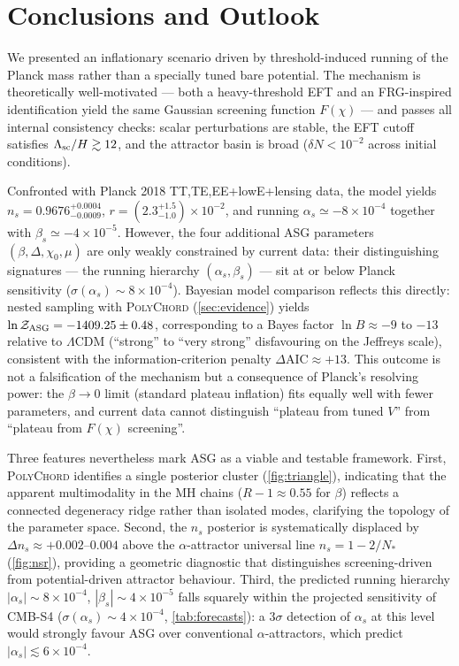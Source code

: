 \documentclass[11pt,a4paper]{article}
\begin{document}
\section{Conclusions and Outlook}
We presented an inflationary scenario driven by threshold-induced running of the Planck mass rather than a specially tuned bare potential. The mechanism is theoretically well-motivated --- both a heavy-threshold EFT and an FRG-inspired identification yield the same Gaussian screening function $F(\chi)$ --- and passes all internal consistency checks: scalar perturbations are stable, the EFT cutoff satisfies $\Lambda_{\rm sc}/H\gtrsim12$, and the attractor basin is broad ($\delta N<10^{-2}$ across initial conditions).

Confronted with Planck 2018 TT,TE,EE+lowE+lensing data, the model yields $n_{s}=0.9676^{+0.0004}_{-0.0009}$, $r=(2.3^{+1.5}_{-1.0})\times10^{-2}$, and running $\alpha_{s}\simeq-8\times10^{-4}$ together with $\beta_{s}\simeq-4\times10^{-5}$. However, the four additional ASG parameters $(\beta,\Delta,\chi_0,\mu)$ are only weakly constrained by current data: their distinguishing signatures --- the running hierarchy $(\alpha_s,\beta_s)$ --- sit at or below Planck sensitivity ($\sigma(\alpha_s)\sim8\times10^{-4}$). Bayesian model comparison reflects this directly: nested sampling with \textsc{PolyChord} (\cref{sec:evidence}) yields $\ln\mathcal{Z}_{\rm ASG}=-1409.25\pm0.48$, corresponding to a Bayes factor $\ln B\approx-9$ to $-13$ relative to $\Lambda$CDM (``strong'' to ``very strong'' disfavouring on the Jeffreys scale), consistent with the information-criterion penalty $\Delta\text{AIC}\approx+13$. This outcome is not a falsification of the mechanism but a consequence of Planck's resolving power: the $\beta\to0$ limit (standard plateau inflation) fits equally well with fewer parameters, and current data cannot distinguish ``plateau from tuned $V$'' from ``plateau from $F(\chi)$ screening''.

Three features nevertheless mark ASG as a viable and testable framework. First, \textsc{PolyChord} identifies a single posterior cluster (\cref{fig:triangle}), indicating that the apparent multimodality in the MH chains ($R{-}1\approx0.55$ for $\beta$) reflects a connected degeneracy ridge rather than isolated modes, clarifying the topology of the parameter space. Second, the $n_s$ posterior is systematically displaced by $\Delta n_s\approx+0.002$--$0.004$ above the $\alpha$-attractor universal line $n_s=1-2/N_*$ (\cref{fig:nsr}), providing a geometric diagnostic that distinguishes screening-driven from potential-driven attractor behaviour. Third, the predicted running hierarchy $|\alpha_s|\sim8\times10^{-4}$, $|\beta_s|\sim4\times10^{-5}$ falls squarely within the projected sensitivity of CMB-S4 ($\sigma(\alpha_s)\sim4\times10^{-4}$, \cref{tab:forecasts}): a $3\sigma$ detection of $\alpha_s$ at this level would strongly favour ASG over conventional $\alpha$-attractors, which predict $|\alpha_s|\lesssim6\times10^{-4}$.
\end{document}
